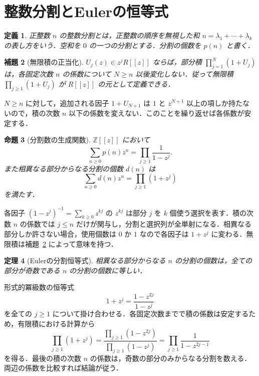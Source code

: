 \documentclass[a5paper,10pt,onecolumn]{jsarticle}
\makeatletter
\theoremstyle{mathnotetheorem}
\newtheorem{theorem}{定理}[section]
\newtheorem{definition}[theorem]{定義}
\newtheorem{lemma}[theorem]{補題}
\newtheorem{proposition}[theorem]{命題}
\renewcommand{\proofname}{証明}
\renewenvironment{proof}[1][\proofname]{%
  \par\pushQED{\qed}\normalfont\topsep4\p@\@plus2\p@\relax
  \trivlist\item[\hskip\labelsep\bfseries #1]\ignorespaces
}{\popQED\endtrivlist\@endpefalse}
\makeatother
\begin{document}
\section{整数分割とEulerの恒等式}
\begin{definition}
正整数 $n$ の\emph{整数分割}とは，正整数の順序を無視した和 $n=\lambda_1+\cdots+\lambda_k$ の表し方をいう．空和を $0$ の一つの分割とする．分割の個数を $p(n)$ と書く．
\end{definition}
\begin{lemma}[無限積の正当化]\label{lem:infprod}
$U_j(z)\in z^jR[[z]]$ ならば，部分積 $\prod_{j=1}^N(1+U_j)$ は，各固定次数 $n$ の係数について $N\ge n$ 以後変化しない．従って無限積 $\prod_{j\ge1}(1+U_j)$ が $R[[z]]$ の元として定義できる．
\end{lemma}
\begin{proof}
$N\ge n$ に対して，追加される因子 $1+U_{N+1}$ は $1$ と $z^{N+1}$ 以上の項しか持たないので，積の次数 $n$ 以下の係数を変えない．このことを繰り返せば各係数が安定する．
\end{proof}
\begin{proposition}[分割数の生成関数]
$\mathbb Z[[z]]$ において
\[
 \sum_{n\ge0}p(n)z^n=\prod_{j\ge1}\frac1{1-z^j}.
\]
また相異なる部分からなる分割の個数 $d(n)$ は
\[
 \sum_{n\ge0}d(n)z^n=\prod_{j\ge1}(1+z^j)
\]
を満たす．
\end{proposition}
\begin{proof}
各因子 $(1-z^j)^{-1}=\sum_{k\ge0}z^{kj}$ の $z^{kj}$ は部分 $j$ を $k$ 個使う選択を表す．積の次数 $n$ の係数では $j\le n$ だけが関与し，分割と選択列が全単射になる．相異なる部分しか許さない場合，使用個数は $0$ か $1$ なので各因子は $1+z^j$ に変わる．無限積は補題~\ref{lem:infprod} によって意味を持つ．
\end{proof}
\begin{theorem}[Eulerの分割恒等式]\label{thm:eulerpartition}
相異なる部分からなる $n$ の分割の個数は，全ての部分が奇数である $n$ の分割の個数に等しい．
\end{theorem}
\begin{proof}
形式的冪級数の恒等式
\[
 1+z^j=\frac{1-z^{2j}}{1-z^j}
\]
を全ての $j\ge1$ について掛け合わせる．各固定次数までで積の係数は安定するため，有限積における計算から
\[
 \prod_{j\ge1}(1+z^j)
 =\frac{\prod_{j\ge1}(1-z^{2j})}{\prod_{j\ge1}(1-z^j)}
 =\prod_{j\ge1}\frac1{1-z^{2j-1}}
\]
を得る．最後の積の次数 $n$ の係数は，奇数の部分のみからなる分割を数える．両辺の係数を比較すれば結論が従う．
\end{proof}
\end{document}
